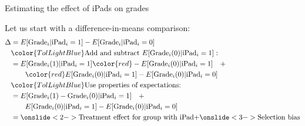 \documentclass[11pt]{beamer}
\begin{document}
\begin{frame}{Estimating the effect of iPads on grades}


Let us start with a difference-in-means comparison: 
\begin{align*}
\Delta &= E[\text{Grade}_i|\text{iPad}_i=1] - E[\text{Grade}_i|\text{iPad}_i=0] \\
& {\color{TolLightBlue}\text{Add and subtract } E[\text{Grade}_i(0)|\text{iPad}_i=1]:} \\
 &=  E[\text{Grade}_i(1)|\text{iPad}_i=1]  {  \color{red}  - E[\text{Grade}_i(0)|\text{iPad}_i=1] \quad + }  \\ 
  &  \qquad {\color{red}E[\text{Grade}_i(0)|\text{iPad}_i=1]} - E[\text{Grade}_i(0)|\text{iPad}_i=0] \\ 
& {\color{TolLightBlue}\text{Use properties of expectations:}} \\ 
   &= E[\text{Grade}_i(1) - \text{Grade}_i(0) | \text{iPad}_i=1] \quad + \\ 
   & \qquad E[\text{Grade}_i(0)|\text{iPad}_i=1] - E[\text{Grade}_i(0)|\text{iPad}_i=0] \\  
& = \onslide<2->{ \text{Treatment effect for group with iPad}  + } \onslide<3->{\text{Selection bias} }
 \end{align*}   
    
\end{frame}
\end{document}
